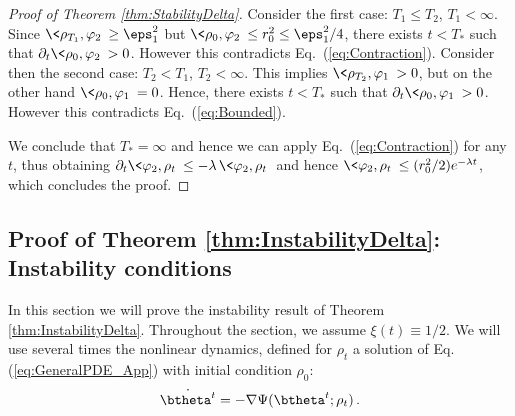 \documentclass[11pt]{article}
\begin{document}
\begin{proof}[Proof of Theorem  \ref{thm:StabilityDelta}]
Consider the first case: $T_1\le T_2$, $T_1<\infty$. Since $\<\rho_{T_1},\varphi_2\> \ge \eps_1^2$ but $\<\rho_0,\varphi_2\>\le r_0^2\le \eps_1^2/4$,
there exists $t<T_*$ such that $\partial_t\<\rho_0,\varphi_2\> >0$. However this contradicts Eq.~(\ref{eq:Contraction}).
Consider then the second case: $T_2 < T_1$, $T_2<\infty$. This implies $\<\rho_{T_2},\varphi_1\> >0$, but on the other hand $\<\rho_0,\varphi_1\>=0$.
Hence, there exists $t<T_*$ such that $\partial_t\<\rho_0,\varphi_1\> >0$. However this contradicts Eq.~(\ref{eq:Bounded}).

We conclude that $T_*=\infty$ and hence we can apply Eq.~(\ref{eq:Contraction}) for any $t$, thus obtaining
$\partial_t\<\varphi_2,\rho_t\> \le -\lambda\, \<\varphi_2,\rho_t\>$ and hence $\<\varphi_2,\rho_t\>\le (r_0^2/2)e^{-\lambda t}$, which concludes the proof.
\end{proof}


\subsection{Proof of Theorem  \ref{thm:InstabilityDelta}: Instability conditions}
\label{sec:InstDelta}

In this section we will prove the instability result of Theorem \ref{thm:InstabilityDelta}. Throughout the section, we assume $\xi(t) \equiv 1/2$. 
We will use several times the nonlinear dynamics, defined for $\rho_t$ a solution of  Eq. (\ref{eq:GeneralPDE_App})
with initial condition $\rho_0$:
%
\begin{align}
%
\dot{\btheta^t} = -\nabla \Psi(\btheta^t;\rho_t)\, .\label{eq:ODE}
%
\end{align}
\end{document}
